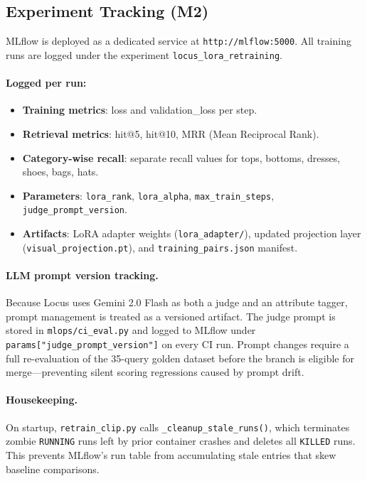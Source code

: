 \documentclass[12pt]{article}
\begin{document}
\subsection{Experiment Tracking (M2)}

MLflow is deployed as a dedicated service at \texttt{http://mlflow:5000}. All training runs are logged under the experiment \texttt{locus\_lora\_retraining}.

\paragraph{Logged per run:}
\begin{itemize}[leftmargin=*, itemsep=1pt]
  \item \textbf{Training metrics}: loss and validation\_loss per step.
  \item \textbf{Retrieval metrics}: hit@5, hit@10, MRR (Mean Reciprocal Rank).
  \item \textbf{Category-wise recall}: separate recall values for tops, bottoms, dresses, shoes, bags, hats.
  \item \textbf{Parameters}: \texttt{lora\_rank}, \texttt{lora\_alpha}, \texttt{max\_train\_steps}, \texttt{judge\_prompt\_version}.
  \item \textbf{Artifacts}: LoRA adapter weights (\texttt{lora\_adapter/}), updated projection layer (\texttt{visual\_projection.pt}), and \texttt{training\_pairs.json} manifest.
\end{itemize}

\paragraph{LLM prompt version tracking.}
Because Locus uses Gemini 2.0 Flash as both a judge and an attribute tagger, prompt management is treated as a versioned artifact. The judge prompt is stored in \texttt{mlops/ci\_eval.py} and logged to MLflow under \texttt{params["judge\_prompt\_version"]} on every CI run. Prompt changes require a full re-evaluation of the 35-query golden dataset before the branch is eligible for merge---preventing silent scoring regressions caused by prompt drift.

\paragraph{Housekeeping.}
On startup, \texttt{retrain\_clip.py} calls \texttt{\_cleanup\_stale\_runs()}, which terminates zombie \texttt{RUNNING} runs left by prior container crashes and deletes all \texttt{KILLED} runs. This prevents MLflow's run table from accumulating stale entries that skew baseline comparisons.
\end{document}
